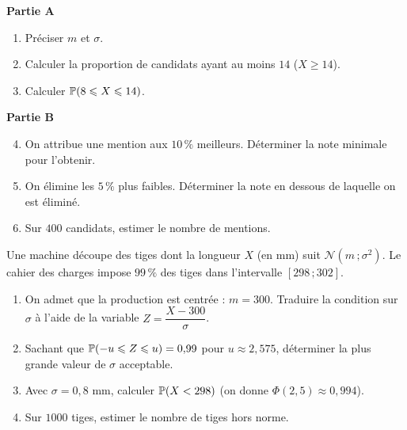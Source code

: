 \textbf{Partie A}
\begin{enumerate}
	\item Préciser $m$ et $\sigma$.
	\item Calculer la proportion de candidats ayant au moins $14$
	($X\geqslant 14$).
	\item Calculer $\mathbb{P}(8\leqslant X\leqslant 14)$.
\end{enumerate}

\textbf{Partie B}
\begin{enumerate}
	\setcounter{enumi}{3}
	\item On attribue une mention aux $10\,\%$ meilleurs. Déterminer la note
	minimale pour l'obtenir.
	\item On élimine les $5\,\%$ plus faibles. Déterminer la note en dessous
	de laquelle on est éliminé.
	\item Sur $400$ candidats, estimer le nombre de mentions.
\end{enumerate}

Une machine découpe des tiges dont la longueur $X$ (en mm) suit
$\mathscr{N}(m\,;\sigma^2)$. Le cahier des charges impose
$99\,\%$ des tiges dans l'intervalle $[298\,;302]$.
\begin{enumerate}
	\item On admet que la production est centrée : $m = 300$. Traduire la
	condition sur $\sigma$ à l'aide de la variable $Z = \dfrac{X-300}{\sigma}$.
	\item Sachant que $\mathbb{P}(-u\leqslant Z\leqslant u)=0{,}99$ pour
	$u\approx 2{,}575$, déterminer la plus grande valeur de $\sigma$
	acceptable.
	\item Avec $\sigma = 0{,}8$ mm, calculer $\mathbb{P}(X<298)$ (on donne
	$\Phi(2{,}5)\approx 0{,}994$).
	\item Sur $1000$ tiges, estimer le nombre de tiges hors norme.
\end{enumerate}
